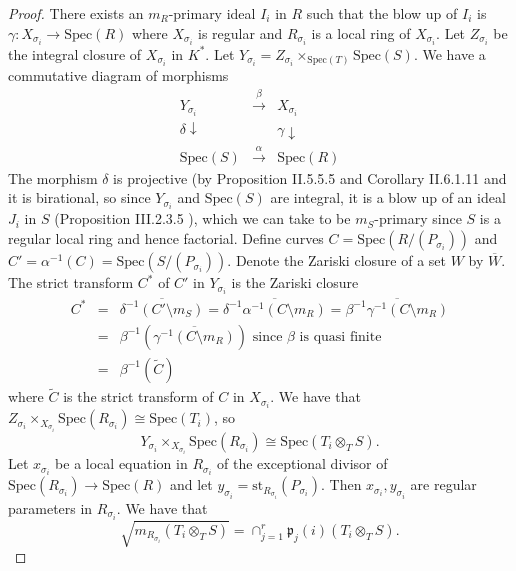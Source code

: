 \documentclass[11pt]{amsart}
\begin{document}
\begin{proof}
 There exists an $m_R$-primary ideal $I_i$ in $R$ such that the blow up of $I_i$ is $\gamma:X_{\sigma_i}\rightarrow \mbox{Spec}(R)$ where $X_{\sigma_i}$ is regular and $R_{\sigma_i}$ is a local ring of $X_{\sigma_i}$. Let $Z_{\sigma_i}$ be the integral closure of $X_{\sigma_i}$ in $K^*$. Let $Y_{\sigma_i}=Z_{\sigma_i}\times_{\mbox{Spec}(T)}\mbox{Spec}(S)$.
 We have a commutative diagram  of morphisms
 $$
 \begin{array}{lll}
 Y_{\sigma_i}&\stackrel{\beta}{\rightarrow}&X_{\sigma_i}\\
 \delta\downarrow&&\gamma\downarrow\\
 \mbox{Spec}(S)&\stackrel{\alpha}{\rightarrow}&\mbox{Spec}(R)
 \end{array}
 $$
 The morphism $\delta$ is projective (by Proposition II.5.5.5 \cite{EGAII} and Corollary II.6.1.11 \cite{EGAII} and it is birational, so since $Y_{\sigma_i}$ and $\mbox{Spec}(S)$ are integral, it is a blow up of an ideal $J_i$ in $S$ (Proposition III.2.3.5 \cite{EGAIII}), which we can take to be $m_S$-primary since $S$ is a regular local ring and hence factorial. Define curves $C=\mbox{Spec}(R/(P_{\sigma_i}))$ and $C'=\alpha^{-1}(C)=\mbox{Spec}(S/(P_{\sigma_i}))$. Denote the Zariski closure of a set $W$ by $\overline W$. The strict transform $C^*$ of $C'$ in $Y_{\sigma_i}$ is the Zariski closure
  \begin{equation}\label{eqN21}
  \begin{array}{lll}
  C^*&=&\overline{\delta^{-1}(C'\setminus m_S)}=\overline{\delta^{-1}\alpha^{-1}(C\setminus m_R)}
  =\overline{\beta^{-1}\gamma^{-1}(C\setminus m_R)}\\
  &=&\beta^{-1}(\overline{\gamma^{-1}(C\setminus m_R)})\mbox{ since $\beta$ is quasi finite}\\
  &=& \beta^{-1}(\tilde C)
  \end{array}
  \end{equation}
 where $\tilde C$ is the strict transform of $C$ in $X_{\sigma_i}$.  We have that $Z_{\sigma_i}\times_{X_{\sigma_i}}\mbox{Spec}(R_{\sigma_i})\cong\mbox{Spec}(T_i)$, so
 $$
 Y_{\sigma_i}\times_{X_{\sigma_i}}\mbox{Spec}(R_{\sigma_i})\cong \mbox{Spec}(T_i\otimes_TS).
 $$
 Let $x_{\sigma_i}$ be a local equation in $R_{\sigma_i}$ of the exceptional divisor of $\mbox{Spec}(R_{\sigma_i})\rightarrow \mbox{Spec}(R)$ and let $y_{\sigma_i}=\mbox{st}_{R_{\sigma_i}}(P_{\sigma_i})$. Then 
 $x_{\sigma_i},y_{\sigma_i}$ are regular parameters in $R_{\sigma_i}$. We have that
 $$
 \sqrt{m_{R_{\sigma_i}}(T_i\otimes_TS)}=\cap_{j=1}^r\mathfrak p_j(i)(T_i\otimes_TS).
$$
\end{proof}
\end{document}
